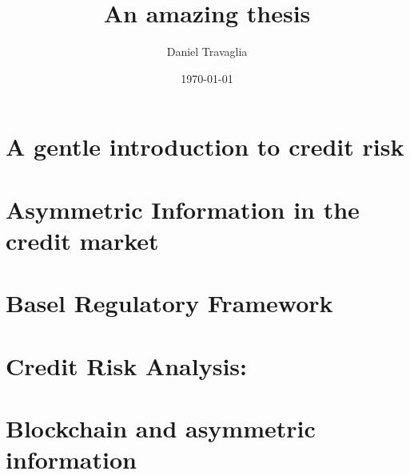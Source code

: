 \documentclass[a4paper,12pt]{article}
\begin{document}
    
    \title{An amazing thesis}
    \author{Daniel Travaglia}
    \date{\today}
    \maketitle

    \pagebreak

    \pagebreak
    
    \section{A gentle introduction to credit risk}

    \pagebreak
    \section{Asymmetric Information in the credit market}    
    
    \pagebreak
    \section{Basel Regulatory Framework}
    
    \pagebreak
    \section{Credit Risk Analysis:}
    
    \pagebreak
    \section{Blockchain and asymmetric information}
\end{document}
